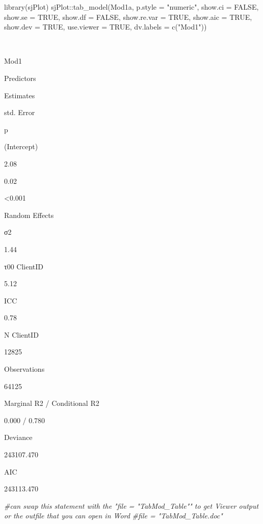\documentclass[
  english,
]{book}
\newenvironment{Shaded}{\begin{snugshade}}{\end{snugshade}}
\newcommand{\AttributeTok}[1]{\textcolor[rgb]{0.77,0.63,0.00}{#1}}
\newcommand{\CommentTok}[1]{\textcolor[rgb]{0.56,0.35,0.01}{\textit{#1}}}
\newcommand{\ConstantTok}[1]{\textcolor[rgb]{0.00,0.00,0.00}{#1}}
\newcommand{\FunctionTok}[1]{\textcolor[rgb]{0.00,0.00,0.00}{#1}}
\newcommand{\NormalTok}[1]{#1}
\newcommand{\SpecialCharTok}[1]{\textcolor[rgb]{0.00,0.00,0.00}{#1}}
\newcommand{\StringTok}[1]{\textcolor[rgb]{0.31,0.60,0.02}{#1}}
\begin{document}
\begin{Shaded}
\begin{Highlighting}[]
\FunctionTok{library}\NormalTok{(sjPlot)}
\NormalTok{sjPlot}\SpecialCharTok{::}\FunctionTok{tab\_model}\NormalTok{(Mod1a, }\AttributeTok{p.style =} \StringTok{"numeric"}\NormalTok{, }\AttributeTok{show.ci =} \ConstantTok{FALSE}\NormalTok{, }\AttributeTok{show.se =} \ConstantTok{TRUE}\NormalTok{, }\AttributeTok{show.df =} \ConstantTok{FALSE}\NormalTok{, }\AttributeTok{show.re.var =} \ConstantTok{TRUE}\NormalTok{, }\AttributeTok{show.aic =} \ConstantTok{TRUE}\NormalTok{, }\AttributeTok{show.dev =} \ConstantTok{TRUE}\NormalTok{, }\AttributeTok{use.viewer =} \ConstantTok{TRUE}\NormalTok{, }\AttributeTok{dv.labels =} \FunctionTok{c}\NormalTok{(}\StringTok{"Mod1"}\NormalTok{))}
\end{Highlighting}
\end{Shaded}

~

Mod1

Predictors

Estimates

std. Error

p

(Intercept)

2.08

0.02

\textless0.001

Random Effects

σ2

1.44

τ00 ClientID

5.12

ICC

0.78

N ClientID

12825

Observations

64125

Marginal R2 / Conditional R2

0.000 / 0.780

Deviance

243107.470

AIC

243113.470

\begin{Shaded}
\begin{Highlighting}[]
\CommentTok{\#can swap this statement with the "file = "TabMod\_Table"" to get Viewer output or the outfile that you can open in Word}
\CommentTok{\#file = "TabMod\_Table.doc"}
\end{Highlighting}
\end{Shaded}
\end{document}
